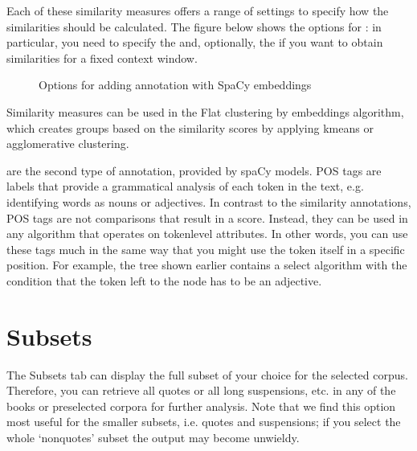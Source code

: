 \documentclass[letterpaper,10pt,english]{sphinxmanual}
\begin{document}
\sphinxAtStartPar
Each of these similarity measures offers a range of settings to specify
how the similarities should be calculated. The figure below shows the
options for : in particular, you need
to specify the  and, optionally, the  if you want to
obtain similarities for a fixed context window.

\begin{figure}[htbp]
\centering
\capstart

\noindent{}
\caption{Options for adding annotation with SpaCy embeddings}\label{\detokenize{clicanalysis/flexiconc:id11}}\label{\detokenize{clicanalysis/flexiconc:flexiclic-annotations-spacy}}\end{figure}

\sphinxAtStartPar
Similarity measures can be used in the Flat clustering by embeddings
algorithm, which creates groups based on the similarity scores by
applying k\sphinxhyphen{}means or agglomerative clustering.

\sphinxAtStartPar
{} are the second type of annotation,
provided by spaCy models. POS tags are labels that provide a grammatical
analysis of each token in the text, e.g. identifying words as nouns or
adjectives. In contrast to the similarity annotations, POS tags are not
comparisons that result in a score. Instead, they can be used in any
algorithm that operates on token\sphinxhyphen{}level attributes. In other words, you
can use these tags much in the same way that you might use the token
itself in a specific position. For example, the tree shown earlier
contains a select algorithm with the condition that the token left to
the node has to be an adjective.

\sphinxstepscope


\chapter{Subsets}
\label{\detokenize{clicanalysis/subsets:subsets}}\label{\detokenize{clicanalysis/subsets:id1}}\label{\detokenize{clicanalysis/subsets::doc}}
\sphinxAtStartPar
The Subsets tab can display the full subset of your choice for the
selected corpus. Therefore, you can retrieve all quotes or all long
suspensions, etc. in any of the books or pre\sphinxhyphen{}selected corpora for
further analysis. Note that we find this option most useful for the
smaller subsets, i.e. quotes and suspensions; if you select the whole
‘non\sphinxhyphen{}quotes’ subset the output may become unwieldy.
\end{document}
